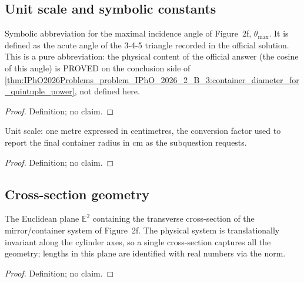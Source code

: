 \subsection*{Unit scale and symbolic constants}

\begin{definition}
\label{def:IPhO2026Problems_problem_IPhO_2026_2_B_3:thetaMaxRecorded}
Symbolic abbreviation for the maximal incidence angle of Figure~2f,
$\theta_{\max}$.  It is defined as the acute angle of the 3-4-5 triangle
recorded in the official solution.  This is a pure abbreviation: the
physical content of the official answer (the cosine of this angle) is
PROVED on the conclusion side of
\cref{thm:IPhO2026Problems_problem_IPhO_2026_2_B_3:container_diameter_for_quintuple_power},
not defined here.
\end{definition}
\begin{proof}
Definition; no claim.
\end{proof}

\begin{definition}
\label{def:IPhO2026Problems_problem_IPhO_2026_2_B_3:metreInCentimetres}
Unit scale: one metre expressed in centimetres, the conversion factor used
to report the final container radius in cm as the subquestion requests.
\end{definition}
\begin{proof}
Definition; no claim.
\end{proof}

\subsection*{Cross-section geometry}

\begin{definition}
\label{def:IPhO2026Problems_problem_IPhO_2026_2_B_3:CrossSectionPlane}
The Euclidean plane $\mathbb{E}^2$ containing the transverse cross-section
of the mirror/container system of Figure~2f.  The physical system is
translationally invariant along the cylinder axes, so a single cross-section
captures all the geometry; lengths in this plane are identified with real
numbers via the norm.
\end{definition}
\begin{proof}
Definition; no claim.
\end{proof}

